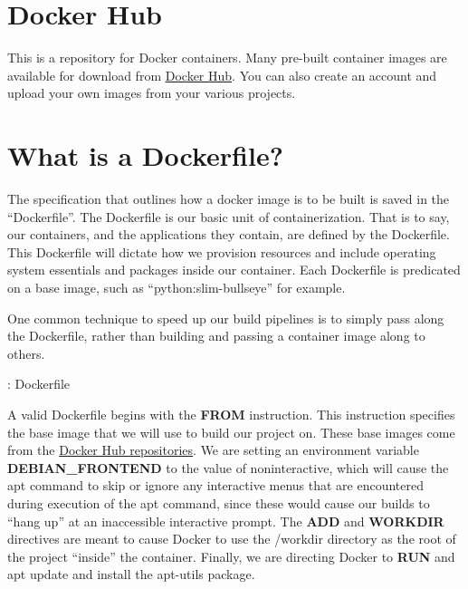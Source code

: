 \section{Docker Hub}

\justifying
This is a repository for Docker containers. Many pre-built container images are available for download
from \href{https://hub.docker.com/}{Docker Hub}. You can also create an account and upload your own images from your various
projects.

\section{What is a Dockerfile?}

\justifying
The specification that outlines how a docker image is to be built is saved in the ``Dockerfile''.
The Dockerfile is our basic unit of containerization. That is to say, our containers, and the applications they contain, are
defined by the Dockerfile. This Dockerfile will dictate how we provision resources and include operating system essentials and packages
inside our container. Each Dockerfile is predicated on a base image, such as ``python:slim-bullseye'' for example.

\justifying
One common technique to speed up our build pipelines is to simply pass along the Dockerfile, rather than
building and passing a container image along to others.

\justifying
\begin{mybox}{\thetcbcounter: Dockerfile}
  
  \label{mydockerfile}
\end{mybox}

\justifying
A valid Dockerfile begins with the \textbf{FROM} instruction. This instruction specifies the base image that we
will use to build our project on. These base images come from the
\href{https://docs.docker.com/docker-hub/repos/}{Docker Hub repositories}. We are setting an environment variable
\textbf{DEBIAN\_FRONTEND} to the value of noninteractive, which will cause the apt command to skip or ignore any
interactive menus that are encountered during execution of the apt command, since these would cause
our builds to ``hang up'' at an inaccessible interactive prompt. The \textbf{ADD} and \textbf{WORKDIR} directives
are meant to cause Docker to use the /workdir directory as the root of the project ``inside'' the
container. Finally, we are directing Docker to \textbf{RUN} and apt update and install the apt-utils package.

